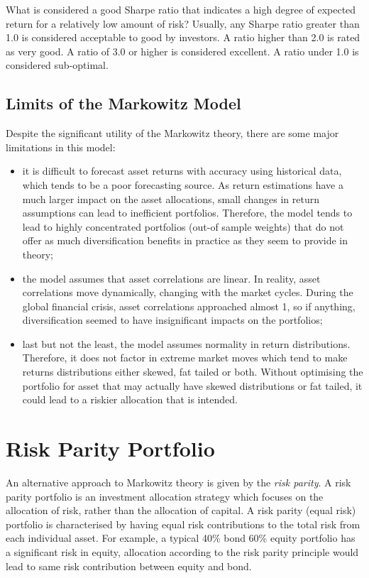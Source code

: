 What is considered a good Sharpe ratio that indicates a high degree of
expected return for a relatively low amount of risk? Usually, any Sharpe
ratio greater than 1.0 is considered acceptable to good by investors. A
ratio higher than 2.0 is rated as very good. A ratio of 3.0 or higher is
considered excellent. A ratio under 1.0 is considered sub-optimal.

\subsection{Limits of the Markowitz
Model}\label{limits-of-the-markowitz-model}

Despite the significant utility of the Markowitz theory, there are some
major limitations in this model:

\begin{itemize}
\tightlist
\item
  it is difficult to forecast asset returns with accuracy using
  historical data, which tends to be a poor forecasting source. As
  return estimations have a much larger impact on the asset allocations,
  small changes in return assumptions can lead to inefficient
  portfolios. Therefore, the model tends to lead to highly concentrated
  portfolios (out-of sample weights) that do not offer as much
  diversification benefits in practice as they seem to provide in
  theory;
\item
  the model assumes that asset correlations are linear. In reality,
  asset correlations move dynamically, changing with the market cycles.
  During the global financial crisis, asset correlations approached
  almost 1, so if anything, diversification seemed to have insignificant
  impacts on the portfolios;
\item
  last but not the least, the model assumes normality in return
  distributions. Therefore, it does not factor in extreme market moves
  which tend to make returns distributions either skewed, fat tailed or
  both. Without optimising the portfolio for asset that may actually
  have skewed distributions or fat tailed, it could lead to a riskier
  allocation that is intended.
\end{itemize}

\section{Risk Parity Portfolio}\label{risk-parity-portfolio}

An alternative approach to Markowitz theory is given by the
\emph{risk parity}. A risk parity portfolio is an investment allocation
strategy which focuses on the allocation of risk, rather than the
allocation of capital. A risk parity (equal risk) portfolio is
characterised by having equal risk contributions to the total risk from
each individual asset. For example, a typical 40\% bond 60\% equity
portfolio has a significant risk in equity, allocation according to the
risk parity principle would lead to same risk contribution between
equity and bond.

